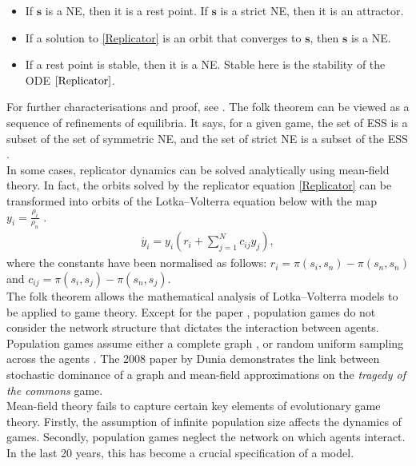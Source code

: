 \begin{itemize}
    \item If $\mathbf{s}$ is a NE, then it is a rest point. If $\mathbf{s}$ is a strict NE, then it is an attractor. 
    \item If a solution to \eqref{Replicator} is an orbit that converges to $\mathbf{s}$, then $\mathbf{s}$ is a NE. 
    \item If a rest point is stable, then it is a NE. Stable here is the stability of the ODE $\eqref{Replicator}$. 
\end{itemize}
For further characterisations and proof, see \cite{RN99, RN81}. The folk theorem can be viewed as a sequence of refinements of equilibria. It says,  for a given game, the set of ESS is a subset of the set of symmetric NE, and the set of strict NE is a subset of the ESS \cite{RN91}.  \\


In some cases, replicator dynamics can be solved analytically using mean-field theory. In fact, the orbits solved by the replicator equation \eqref{Replicator} can be transformed into orbits of the Lotka--Volterra equation below with the map $y_i = \frac{\rho_i}{\rho_n}$ \cite{RN81}.
\begin{align*} \label{LV}
    \dot{y_i} = y_i\left ( r_i + \sum_{j =1}^N c_{ij} y_j \right ),
\end{align*}
where the constants have been normalised as follows: $r_i = \pi(s_i,s_n) - \pi(s_n,s_n)$ and $c_{ij} = \pi(s_i,s_j) - \pi(s_n,s_j)$. \\


The folk theorem allows the mathematical analysis of Lotka--Volterra models to be applied to game theory. Except for the paper \cite{RN75}, population games do not consider the network structure that dictates the interaction between agents. Population games assume either a complete graph \cite{RN67}, or random uniform sampling across the agents \cite{RN47}. The 2008 paper by Dunia \cite{RN75} demonstrates the link between stochastic dominance of a graph and mean-field approximations on the \emph{tragedy of the commons} game. \\

Mean-field theory fails to capture certain key elements of evolutionary game theory. Firstly, the assumption of infinite population size affects the dynamics of games. Secondly, population games neglect the network on which agents interact. In the last 20 years, this has become a crucial specification of a model. \\

